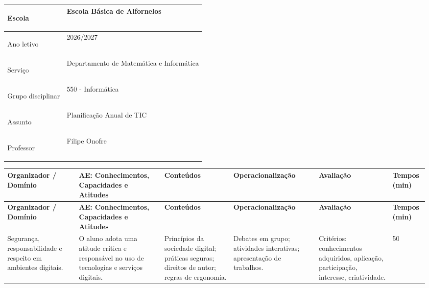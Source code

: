 \documentclass[11pt,a4paper]{article}
\begin{document}
\CabecalhoAlfornelos


\renewcommand{\arraystretch}{1.2}

\begin{tabularx}{\textwidth}{|>{\bfseries\raggedright\arraybackslash}p{3.5cm}|X|}
\hline
Escola & Escola Básica de Alfornelos \\
\hline
Ano letivo & 2026/2027 \\
\hline
Serviço & Departamento de Matemática e Informática \\
\hline
Grupo disciplinar & 550 - Informática \\
\hline
Assunto & Planificação Anual de TIC \\
\hline
Professor & Filipe Onofre\\
\hline
\end{tabularx}

\renewcommand{\arraystretch}{1.3}

\begin{longtable}{|p{3cm}|p{4cm}|p{3.5cm}|p{3.5cm}|p{3.5cm}|p{2cm}|}
\hline
\rowcolor{headerpink}
\textbf{Organizador / Domínio} &
\textbf{AE: Conhecimentos, Capacidades e Atitudes} &
\textbf{Conteúdos} &
\textbf{Operacionalização} &
\textbf{Avaliação} &
\textbf{Tempos (min)} \\
\hline
\endfirsthead

\hline
\rowcolor{headerpink}
\textbf{Organizador / Domínio} &
\textbf{AE: Conhecimentos, Capacidades e Atitudes} &
\textbf{Conteúdos} &
\textbf{Operacionalização} &
\textbf{Avaliação} &
\textbf{Tempos (min)} \\
\hline
\endhead

Segurança, responsabilidade e respeito em ambientes digitais. &
O aluno adota uma atitude crítica e responsável no uso de tecnologias e serviços digitais. &
Princípios da sociedade digital; práticas seguras; direitos de autor; regras de ergonomia. &
Debates em grupo; atividades interativas; apresentação de trabalhos. &
Critérios: conhecimentos adquiridos, aplicação, participação, interesse, criatividade. &
50 \\
\hline


\end{longtable}
\end{document}

